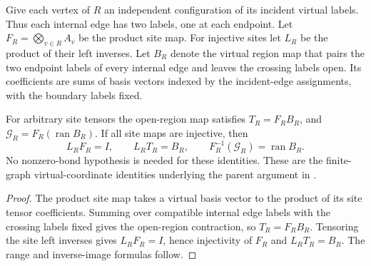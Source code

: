 \begin{definition}%
    \label{def:peps_injective_vertex_coordinates}
    \leanok
    Give each vertex of $R$ an independent configuration of its incident
    virtual labels. Thus each internal edge has two labels, one at each
    endpoint. Let $F_R=\bigotimes_{v\in R}A_v$ be the product site map.
    For injective sites let $L_R$ be the product of their left inverses.
    Let $B_R$ denote the virtual region map that pairs the two endpoint
    labels of every internal edge and leaves the crossing labels open.
    Its coefficients are sums of basis vectors indexed by the
    incident-edge assignments, with the boundary labels fixed.
\end{definition}

\begin{lemma}%
    \label{thm:peps_injective_vertex_reconstruction}
    \leanok
    For arbitrary site tensors the open-region map satisfies
    $T_R=F_RB_R$, and $\mathcal G_R=F_R(\operatorname{ran}B_R)$.
    If all site maps are injective, then
    \[
        L_RF_R=I,\qquad L_RT_R=B_R,\qquad
        F_R^{-1}(\mathcal G_R)=\operatorname{ran}B_R.
    \]
    No nonzero-bond hypothesis is needed for these identities.
    These are the finite-graph virtual-coordinate identities underlying
    the parent argument in \cite[Section IV.C.1]{Cirac2021Matrix}.
\end{lemma}

\begin{proof}\leanok
    The product site map takes a virtual basis vector to the product of
    its site tensor coefficients. Summing over compatible internal edge
    labels with the crossing labels fixed gives the open-region
    contraction, so $T_R=F_RB_R$. Tensoring the site left inverses gives
    $L_RF_R=I$, hence injectivity of $F_R$ and $L_RT_R=B_R$.
    The range and inverse-image formulas follow.
\end{proof}
